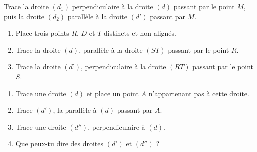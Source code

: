\documentclass[a4paper,10pt]{report}
\begin{document}
\newpage
\begin{ex}
Trace la droite $(d_1)$ perpendiculaire à la droite $(d)$ passant par le point $M$, puis la droite $(d_2)$ parallèle à la droite $(d')$ passant par $M$.

\begin{center}
\end{center}
\end{ex}

\begin{ex}

\medskip
\begin{enumerate}
\item Place trois points $R$, $D$ et $T$ distincts et non alignés.
\item Trace la droite $(d)$, parallèle à la droite $(ST)$ passant par le point $R$.
\item Trace la droite $(d’)$, perpendiculaire à la droite $(RT)$ passant par le point $S$.
\end{enumerate}
\end{ex}

\begin{ex}

\medskip
\begin{enumerate}
\item Trace une droite $(d)$ et place un point $A$ n'appartenant pas à cette droite.
\item Trace $(d')$, la parallèle à $(d)$ passant par $A$.
\item Trace une droite $(d'')$, perpendiculaire à $(d)$.
\item Que peux-tu dire des droites $(d')$ et $(d'')$ ?
\end{enumerate}
\end{ex}
\end{document}
